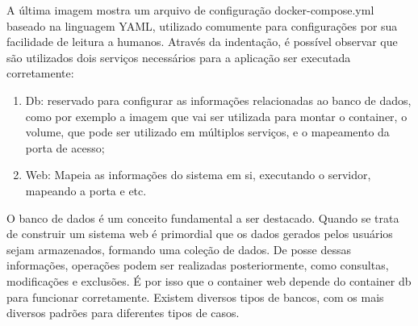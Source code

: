 
A última imagem mostra um arquivo de configuração docker-compose.yml baseado na linguagem YAML, utilizado comumente para configurações por sua facilidade de leitura a humanos. Através da indentação, é possível observar que são utilizados dois serviços necessários para a aplicação ser executada corretamente:

\begin{enumerate}
    \item Db: reservado para configurar as informações relacionadas ao banco de dados, como por exemplo a imagem que vai ser utilizada para montar o container, o volume, que pode ser utilizado em múltiplos serviços, e o mapeamento da porta de acesso;
    \item Web: Mapeia as informações do sistema em si, executando o servidor, mapeando a porta e etc.
\end{enumerate}

O banco de dados é um conceito fundamental a ser destacado. Quando se trata de construir um sistema web é primordial que os dados gerados pelos usuários sejam armazenados, formando uma coleção de dados. De posse dessas informações, operações podem ser realizadas posteriormente, como consultas, modificações e exclusões. É por isso que o container web depende do container db para funcionar corretamente. Existem diversos tipos de bancos, com os mais diversos padrões para diferentes tipos de casos.

